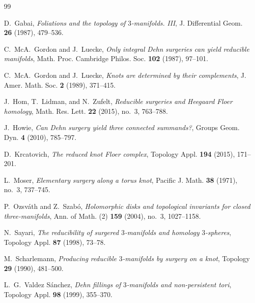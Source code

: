 \documentclass[11pt]{amsart}
\numberwithin{equation}{section}
\begin{document}
\begin{thebibliography}{99}

D.~Gabai,
\emph{Foliations and the topology of $3$-manifolds. III},
J. Differential Geom. \textbf{26} (1987), 479--536.

C.~McA.~Gordon and J.~Luecke,
\emph{Only integral {D}ehn surgeries can yield reducible manifolds},
Math. Proc. Cambridge Philos. Soc. \textbf{102} (1987), 97--101.

C.~McA.~Gordon and J.~Luecke,
\emph{Knots are determined by their complements},
J. Amer. Math. Soc. \textbf{2} (1989), 371--415.

J.~Hom, T.~Lidman, and N.~Zufelt,
\emph{Reducible surgeries and {H}eegaard {F}loer homology},
Math. Res. Lett. \textbf{22} (2015), no.~3, 763--788.

J.~Howie,
\emph{Can {D}ehn surgery yield three connected summands?},
Groups Geom. Dyn. \textbf{4} (2010), 785--797.

D.~Krcatovich,
\emph{The reduced knot {F}loer complex},
Topology Appl. \textbf{194} (2015), 171--201.

L.~Moser,
\emph{Elementary surgery along a torus knot},
Pacific J. Math. \textbf{38} (1971), no.~3, 737--745.

P.~Ozsv\'ath and Z.~Szab\'o,
\emph{Holomorphic disks and topological invariants for closed three-manifolds},
Ann. of Math. (2) \textbf{159} (2004), no.~3, 1027--1158.

N.~Sayari,
\emph{The reducibility of surgered $3$-manifolds and homology $3$-spheres},
Topology Appl. \textbf{87} (1998), 73--78.

M.~Scharlemann,
\emph{Producing reducible $3$-manifolds by surgery on a knot},
Topology \textbf{29} (1990), 481--500.

L.~G.~Valdez S\'anchez,
\emph{Dehn fillings of $3$-manifolds and non-persistent tori},
Topology Appl. \textbf{98} (1999), 355--370.

\end{thebibliography}
\end{document}
